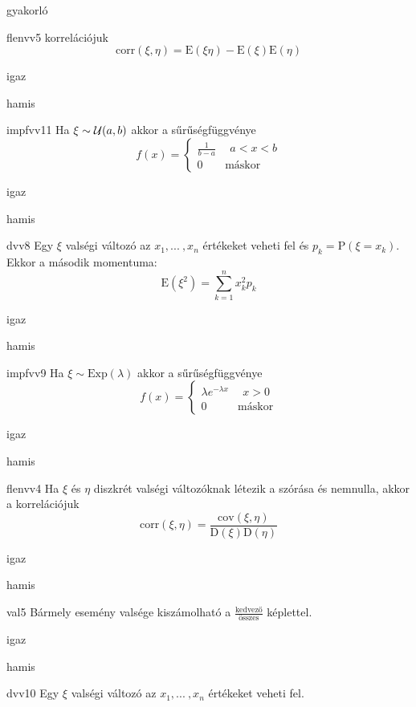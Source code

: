 \documentclass[12pt]{article}
\begin{document}
\begin{quiz}{gyakorló}
\begin{multi}[feedback={Def.}]{flenvv5}
korrelációjuk
$$
\mathrm{corr}(\xi,\eta)=\mathrm{E}(\xi\eta)-\mathrm{E}(\xi)\mathrm{E}(\eta)
$$
\item igaz
\item* hamis
\end{multi}
\begin{multi}[feedback={Def.}]{impfvv11}
Ha $\xi\sim {\cal U}(a,b)$ akkor a sűrűségfüggvénye 
$$
f(x)=
\begin{cases}
\frac{1}{b-a} & \ \ a<x<b \\
0 & \text{máskor} 
\end{cases}
$$
\item* igaz
\item hamis
\end{multi}
\begin{multi}[feedback={Def.}]{dvv8}
Egy $\xi$ valségi változó az $x_1,{...\:}, x_n$ értékeket veheti fel és $p_k=\mathrm{P}(\xi=x_k)$. 
Ekkor a második momentuma:
$$
\mathrm{E}(\xi^2)=\sum_{k=1}^n x_k^2 p_k
$$
\item* igaz
\item hamis
\end{multi}
\begin{multi}[feedback={Def.}]{impfvv9}
Ha $\xi\sim \mathrm{Exp}(\lambda)$ akkor a sűrűségfüggvénye 
$$
f(x)=
\begin{cases}
\lambda e^{-\lambda x}& \ \ x>0\\
0 & \text{máskor} 
\end{cases}
$$
\item* igaz
\item hamis
\end{multi}
\begin{multi}[feedback={Def.}]{flenvv4}
Ha $\xi$ és $\eta$ diszkrét valségi változóknak létezik a szórása és nemnulla, akkor a 
korrelációjuk
$$
\mathrm{corr}(\xi,\eta)=\frac{\mathrm{cov}(\xi,\eta)}{\mathrm{D}(\xi)\mathrm{D}(\eta)}
$$
\item* igaz
\item hamis
\end{multi}
\begin{multi}[feedback={Csak ha az elemi események egyforma valségűek.}]{val5}
Bármely esemény valsége kiszámolható a $\frac{\text{kedvező}}{\text{összes}}$ képlettel.
\item igaz
\item* hamis
\end{multi}
\begin{multi}[feedback={Def./tulajdonság}]{dvv10}
Egy $\xi$ valségi változó az $x_1,{...\:}, x_n$ értékeket veheti fel. 

\end{multi}
\end{quiz}
\end{document}

